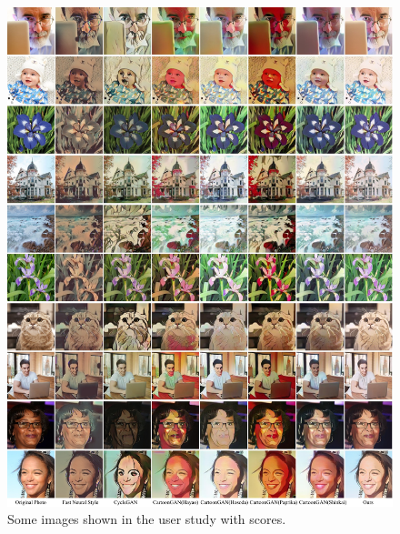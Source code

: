 \documentclass[10pt,twocolumn,letterpaper]{article}
\begin{document}
\begin{figure}[htb]
\vspace{-0.5em}
\centering
\includegraphics[width=\linewidth]{figures/userstudy1.pdf}
\caption{Some images shown in the user study with scores.}
\label{fig:userstudy1}
\end{figure}
\end{document}
